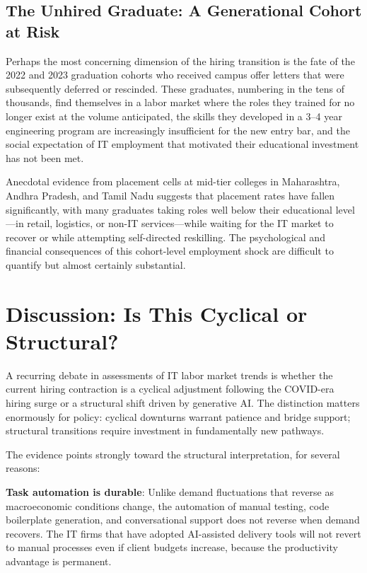 \documentclass[conference]{IEEEtran}
\begin{document}
\subsection{The Unhired Graduate: A Generational Cohort at Risk}

Perhaps the most concerning dimension of the hiring transition is the fate of the 2022 and 2023 graduation cohorts who received campus offer letters that were subsequently deferred or rescinded. These graduates, numbering in the tens of thousands, find themselves in a labor market where the roles they trained for no longer exist at the volume anticipated, the skills they developed in a 3--4 year engineering program are increasingly insufficient for the new entry bar, and the social expectation of IT employment that motivated their educational investment has not been met.

Anecdotal evidence from placement cells at mid-tier colleges in Maharashtra, Andhra Pradesh, and Tamil Nadu suggests that placement rates have fallen significantly, with many graduates taking roles well below their educational level---in retail, logistics, or non-IT services---while waiting for the IT market to recover or while attempting self-directed reskilling. The psychological and financial consequences of this cohort-level employment shock are difficult to quantify but almost certainly substantial.

\section{Discussion: Is This Cyclical or Structural?}
\label{sec:discussion}

A recurring debate in assessments of IT labor market trends is whether the current hiring contraction is a cyclical adjustment following the COVID-era hiring surge or a structural shift driven by generative AI. The distinction matters enormously for policy: cyclical downturns warrant patience and bridge support; structural transitions require investment in fundamentally new pathways.

The evidence points strongly toward the structural interpretation, for several reasons:

\textbf{Task automation is durable}: Unlike demand fluctuations that reverse as macroeconomic conditions change, the automation of manual testing, code boilerplate generation, and conversational support does not reverse when demand recovers. The IT firms that have adopted AI-assisted delivery tools will not revert to manual processes even if client budgets increase, because the productivity advantage is permanent.
\end{document}
